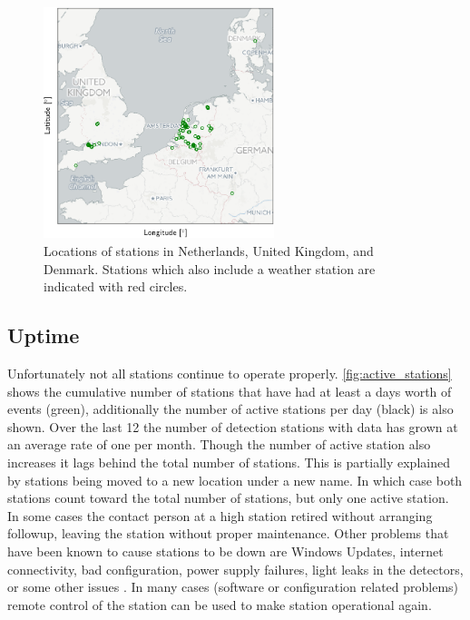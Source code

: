 \begin{figure}
    \centering
    \includegraphics[width=0.6\textwidth]
                    {plots/cluster/network}
    \caption{Locations of \hisparc stations in Netherlands, United Kingdom, and Denmark. Stations which also include a weather station are indicated with red circles.}
    \label{fig:network}
\end{figure}


\subsection{Uptime}

Unfortunately not all stations continue to operate properly. \cref{fig:active_stations} shows the cumulative number of stations that have had at least a days worth of events (green), additionally the number of active stations per day (black) is also shown. Over the last \SI{12}{\year} the number of detection stations with data has grown at an average rate of one per month. Though the number of active station also increases it lags behind the total number of stations. This is partially explained by stations being moved to a new location under a new name. In which case both stations count toward the total number of stations, but only one active station. In some cases the contact person at a high station retired without arranging followup, leaving the station without proper maintenance. Other problems that have been known to cause stations to be down are Windows Updates, internet connectivity, bad configuration, power supply failures, light leaks in the detectors, or some other issues \cite{delaat2013maintenance}. In many cases (software or configuration related problems) remote control of the station can be used to make station operational again.

